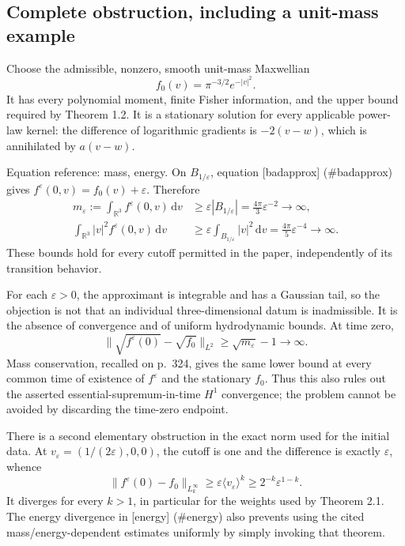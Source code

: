 \documentclass[10pt]{article}
\begin{document}
\subsection*{Complete obstruction, including a unit-mass example}
Choose the admissible, nonzero, smooth unit-mass Maxwellian \[f_0(v)=\pi^{-3/2}e^{-|v|^2}.\] It has every polynomial moment, finite Fisher information, and the upper bound required by Theorem 1.2. It is a stationary solution for every applicable power-law kernel: the difference of logarithmic gradients is \(-2(v-w)\), which is annihilated by \(a(v-w)\).\par
Equation reference: mass, energy. On \(B_{1/\varepsilon}\), equation [badapprox] (\#badapprox) gives \(f^\varepsilon(0,v)=f_0(v)+\varepsilon\). Therefore \[\begin{aligned}
 m_\varepsilon:=\int_{\mathbb R^3}f^\varepsilon(0,v)\,\mathrm dv
 &\geq\varepsilon |B_{1/\varepsilon}|
   =\frac{4\pi}{3}\varepsilon^{-2}\longrightarrow\infty,\\
 \int_{\mathbb R^3}|v|^2f^\varepsilon(0,v)\,\mathrm dv
 &\geq\varepsilon\int_{B_{1/\varepsilon}}|v|^2\,\mathrm dv
   =\frac{4\pi}{5}\varepsilon^{-4}\longrightarrow\infty.\end{aligned}\] These bounds hold for every cutoff permitted in the paper, independently of its transition behavior.\par
For each \(\varepsilon>0\), the approximant is integrable and has a Gaussian tail, so the objection is not that an individual three-dimensional datum is inadmissible. It is the absence of convergence and of uniform hydrodynamic bounds. At time zero, \[\|\sqrt{f^\varepsilon(0)}-\sqrt{f_0}\|_{L^2}
 \geq \sqrt{m_\varepsilon}-1\longrightarrow\infty.\] Mass conservation, recalled on p. 324, gives the same lower bound at every common time of existence of \(f^\varepsilon\) and the stationary \(f_0\). Thus this also rules out the asserted essential-supremum-in-time \(H^1\) convergence; the problem cannot be avoided by discarding the time-zero endpoint.\par
There is a second elementary obstruction in the exact norm used for the initial data. At \(v_\varepsilon=(1/(2\varepsilon),0,0)\), the cutoff is one and the difference is exactly \(\varepsilon\), whence \[\|f^\varepsilon(0)-f_0\|_{L^\infty_k}
 \geq \varepsilon\langle v_\varepsilon\rangle^k
 \geq 2^{-k}\varepsilon^{1-k}.\] It diverges for every \(k>1\), in particular for the weights used by Theorem 2.1. The energy divergence in [energy] (\#energy) also prevents using the cited mass/energy-dependent estimates uniformly by simply invoking that theorem.\par
\end{document}
